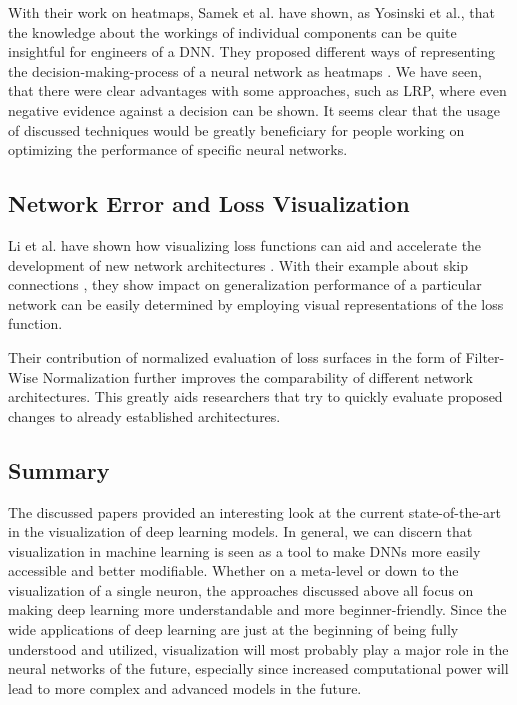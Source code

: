 \documentclass{acmsiggraph}               %
\begin{document}
With their work on heatmaps, Samek et al. have shown, as Yosinski et al., that the knowledge about the workings of individual components can be quite insightful for engineers of a DNN. They proposed different ways of representing the decision-making-process of a neural network as heatmaps \cite{Samek2017}. We have seen, that there were clear advantages with some approaches, such as LRP, where even negative evidence against a decision can be shown. It seems clear that the usage of discussed techniques would be greatly beneficiary for people working on optimizing the performance of specific neural networks.

\subsection{Network Error and Loss Visualization}

Li et al. have shown how visualizing loss functions can aid and accelerate the development of new network architectures \cite{Li2017}.
With their example about skip connections \cite{He2015}, they show impact on generalization performance of a particular network can be easily determined by employing visual representations of the loss function.

Their contribution of normalized evaluation of loss surfaces in the form of Filter-Wise Normalization further improves the comparability of different network architectures. This greatly aids researchers that try to quickly evaluate proposed changes to already established architectures.

\subsection{Summary}
The discussed papers provided an interesting look at the current state-of-the-art in the visualization of deep learning models. In general, we can discern that visualization in machine learning is seen as a tool to make DNNs more easily accessible and better modifiable. Whether on a meta-level or down to the visualization of a single neuron, the approaches discussed above all focus on making deep learning more understandable and more beginner-friendly. Since the wide applications of deep learning are just at the beginning of being fully understood and utilized, visualization will most probably play a major role in the neural networks of the future, especially since increased computational power will lead to more complex and advanced models in the future.
\end{document}
